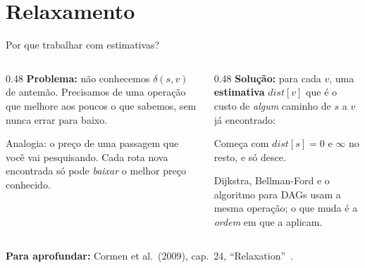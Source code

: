 \documentclass[aspectratio=169,xcolor=table]{beamer}
\newcommand{\fonte}[1]{%
  \vfill
  {\tiny\color{gray!55!black}\textbf{Para aprofundar:} #1\par}%
}
\begin{document}
\section{Relaxamento}

\begin{frame}{Por que trabalhar com estimativas?}
  \begin{columns}[T]
    \begin{column}{0.48\textwidth}
      \textbf{Problema:} não conhecemos $\delta(s,v)$ de antemão. Precisamos de uma operação
      que melhore aos poucos o que sabemos, sem nunca errar para baixo.
      \medskip

      {\small Analogia: o preço de uma passagem que você vai pesquisando. Cada rota nova
      encontrada só pode \emph{baixar} o melhor preço conhecido.}
    \end{column}
    \begin{column}{0.48\textwidth}
      \textbf{Solução:} para cada $v$, uma \textbf{estimativa} $\mathit{dist}[v]$ que é o custo
      de \emph{algum} caminho de $s$ a $v$ já encontrado:
      \begin{center}
      \end{center}
      Começa com $\mathit{dist}[s] = 0$ e $\infty$ no resto, e só desce.
      \medskip

      {\small Dijkstra, Bellman-Ford e o algoritmo para DAGs usam a mesma operação; o que muda
      é a \emph{ordem} em que a aplicam.}
    \end{column}
  \end{columns}
  \fonte{Cormen et al.\ (2009), cap.~24, ``Relaxation''~\cite{cormen2009introduction}.}
\end{frame}
\end{document}
